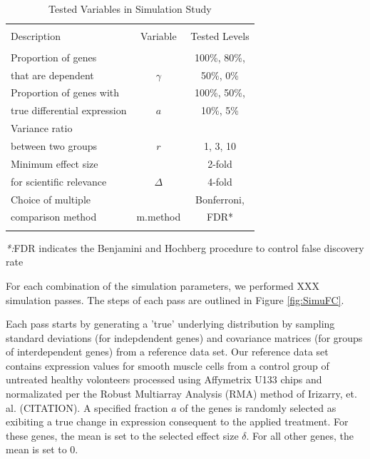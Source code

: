 \documentclass{bioinfo}
\begin{document}
\begin{table}\centering
  \caption{Tested Variables in Simulation Study}\ \\
  \begin{tabular}{lcc}
    \hline\hline
    \\
    Description & Variable & Tested Levels \\
    \\
    \hline\hline
    Proportion of genes &          & 100\%, 80\%,  \\
    that are dependent  & $\gamma$ & 50\%,   0\%    \\
    \hline
    Proportion of genes with     &     &  100\%, 50\%,\\
    true differential expression & $a$ &   10\%,  5\% \\
    \hline
    Variance ratio &  &\\
    between two groups & $r$ & 1, 3, 10  \\
    \hline
    Minimum effect size  & &2-fold \\
    for scientific relevance & $\Delta$ & 4-fold \\
    \hline
    Choice of multiple  & & Bonferroni,  \\
    comparison method & m.method & FDR* \\
    \hline\hline\\
  \end{tabular}
  \emph{*:}FDR indicates the Benjamini and Hochberg procedure to
	control false discovery rate \label{tb:SimuVariables}
\end{table}

For each combination of the simulation parameters, we performed XXX
simulation passes.  The steps of each pass are outlined in Figure
\ref{fig:SimuFC}.

Each pass starts by generating a 'true' underlying distribution by
sampling standard deviations (for indepdendent genes) and covariance
matrices (for groups of interdependent genes) from a reference data
set.  Our reference data set contains expression values for smooth
muscle cells from a control group of untreated healthy volonteers
processed using Affymetrix U133 chips and normalizated per the
Robust Multiarray Analysis (RMA) method of Irizarry,
et. al. (CITATION).  A specified fraction $a$ of the genes is
randomly selected as exibiting a true change in expression
consequent to the applied treatment.  For these genes, the mean is
set to the selected effect size $\delta$.  For all other genes, the
mean is set to $0$.
\end{document}
